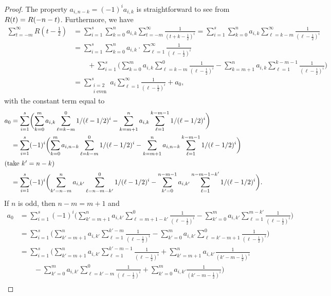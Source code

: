 \documentclass[12pt,reqno]{amsart}
\begin{document}
\begin{proof}
The property $a_{i,n-k}=(-1)^ia_{i,k}$ is straightforward
to see from $R(t)=R(-n-\nobreak t)$. Furthermore, we have
\begin{align*}
\sum_{t=-m}^\infty R(t-\tfrac12)
&=\sum_{i=1}^s\sum_{k=0}^na_{i,k}\sum_{t=-m}^\infty\frac1{(t+k-\frac12)^i}
=\sum_{i=1}^s\sum_{k=0}^na_{i,k}\sum_{\ell=k-m}^\infty\frac1{(\ell-\frac12)^i}
\\
&=\sum_{i=1}^s\sum_{k=0}^na_{i,k}\cdot\sum_{\ell=1}^\infty\frac1{(\ell-\frac12)^i}
\\ &\qquad
+\sum_{i=1}^s\biggl(\sum_{k=0}^ma_{i,k}\sum_{\ell=k-m}^0\frac1{(\ell-\frac12)^i}
-\sum_{k=m+1}^na_{i,k}\sum_{\ell=1}^{k-m-1}\frac1{(\ell-\frac12)^i}\biggr)
\\
&=\sum_{\substack{i=2\\i\;\text{even}}}^sa_i\sum_{\ell=1}^\infty\frac1{(\ell-\frac12)^i}
+a_0,
\end{align*}
with the constant term equal to
\begin{align*}
a_0
&=\sum_{i=1}^s\biggl(\sum_{k=0}^ma_{i,k}\sum_{\ell=k-m}^0\frac1{(\ell-\frac12)^i}
-\sum_{k=m+1}^na_{i,k}\sum_{\ell=1}^{k-m-1}\frac1{(\ell-\frac12)^i}\biggr)
\\
&=\sum_{i=1}^s(-1)^i\biggl(\sum_{k=0}^ma_{i,n-k}\sum_{\ell=k-m}^0\frac1{(\ell-\frac12)^i}
-\sum_{k=m+1}^na_{i,n-k}\sum_{\ell=1}^{k-m-1}\frac1{(\ell-\frac12)^i}\biggr)
\\ \intertext{(take $k'=n-k$)}
&=\sum_{i=1}^s(-1)^i\biggl(\sum_{k'=n-m}^na_{i,k'}\sum_{\ell=n-m-k'}^0\frac1{(\ell-\frac12)^i}
-\sum_{k'=0}^{n-m-1}a_{i,k'}\sum_{\ell=1}^{n-m-1-k'}\frac1{(\ell-\frac12)^i}\biggr).
\end{align*}
If $n$ is odd, then $n-m=m+1$ and
\begin{align*}
a_0
&=\sum_{i=1}^s(-1)^i\biggl(\sum_{k'=m+1}^na_{i,k'}\sum_{\ell=m+1-k'}^0\frac1{(\ell-\frac12)^i}
-\sum_{k'=0}^ma_{i,k'}\sum_{\ell=1}^{m-k'}\frac1{(\ell-\frac12)^i}\biggr)
\\
&=\sum_{i=1}^s\biggl(\sum_{k'=m+1}^na_{i,k'}\sum_{\ell=1}^{k'-m}\frac1{(\ell-\frac12)^i}
-\sum_{k'=0}^ma_{i,k'}\sum_{\ell=k'-m+1}^0\frac1{(\ell-\frac12)^i}\biggr)
\\
&=\sum_{i=1}^s\biggl(\sum_{k'=m+1}^na_{i,k'}
\sum_{\ell=1}^{k'-m-1}\frac1{(\ell-\frac12)^i}
+\sum_{k'=m+1}^na_{i,k'}\frac1{(k'-m-\frac12)^i}
\\ &\qquad
-\sum_{k'=0}^ma_{i,k'}\sum_{\ell=k'-m}^0\frac1{(\ell-\frac12)^i}
+\sum_{k'=0}^ma_{i,k'}\frac1{(k'-m-\frac12)^i}\biggr)
\\

\end{align*}
\end{proof}
\end{document}

